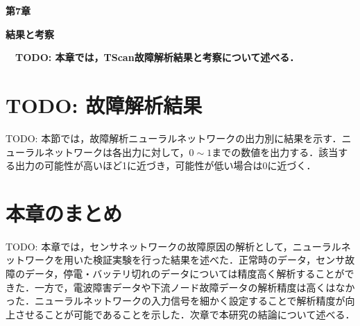 \newpage
\setcounter{chapter}{7}
\setcounter{section}{0}


\begin{center}
\vspace{0.5cm}
\huge{\bf 第7章}
\par
\vspace{1cm}
\hrulefill
\par
\vspace{1cm}
\huge{\bf 結果と考察}
\par
\vspace{0.5cm}
\hrulefill
\vspace{1cm}
\par

\begin{flushleft}
\large{{\bf　TODO: 本章では，TScan故障解析結果と考察について述べる．}}
\end{flushleft}
\end{center}



\newpage
\section{TODO: 故障解析結果}
TODO: 本節では，故障解析ニューラルネットワークの出力別に結果を示す．ニューラルネットワークは各出力に対して，$0 \sim 1$までの数値を出力する．該当する出力の可能性が高いほど1に近づき，可能性が低い場合は0に近づく．

\newpage

\section{本章のまとめ}
TODO: 本章では，センサネットワークの故障原因の解析として，ニューラルネットワークを用いた検証実験を行った結果を述べた．正常時のデータ，センサ故障のデータ，停電・バッテリ切れのデータについては精度高く解析することができた．一方で，電波障害データや下流ノード故障データの解析精度は高くはなかった．ニューラルネットワークの入力信号を細かく設定することで解析精度が向上させることが可能であることを示した．次章で本研究の結論について述べる．
\newpage

